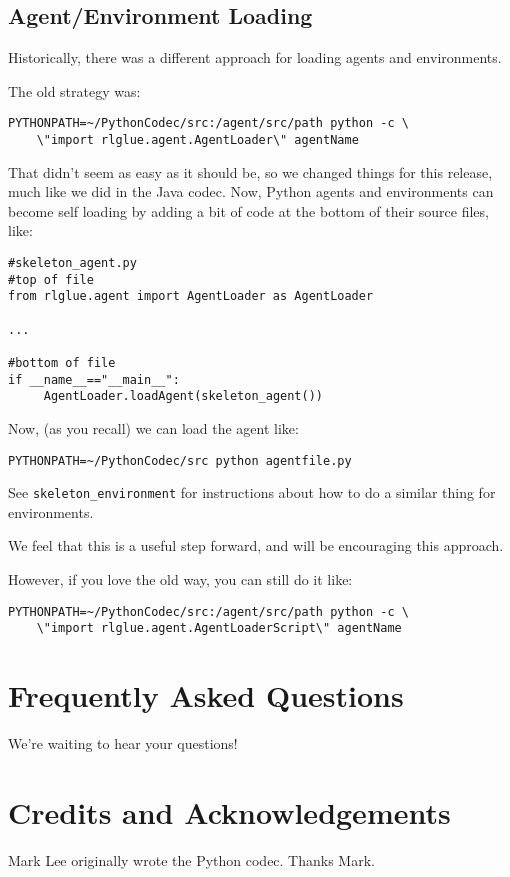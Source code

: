 \documentclass[11pt]{article}
\begin{document}
\subsection{Agent/Environment Loading}
Historically, there was a different approach for loading agents and environments.

The old strategy was:
\begin{verbatim}
PYTHONPATH=~/PythonCodec/src:/agent/src/path python -c \
    \"import rlglue.agent.AgentLoader\" agentName
\end{verbatim}

That didn't seem as easy as it should be, so we changed things for this release, much like we did in the Java codec. Now, Python agents and environments can become 
self loading by adding a bit of code at the bottom of their source files, like:
\begin{verbatim}
#skeleton_agent.py
#top of file
from rlglue.agent import AgentLoader as AgentLoader

...

#bottom of file
if __name__=="__main__":
     AgentLoader.loadAgent(skeleton_agent())
\end{verbatim}

Now, (as you recall) we can load the agent like:
\begin{verbatim}
PYTHONPATH=~/PythonCodec/src python agentfile.py
\end{verbatim}

See \texttt{skeleton\_environment} for instructions about how to do a similar thing for environments.

We feel that this is a useful step forward, and will be encouraging this approach.

However, if you love the old way, you can still do it like:

\begin{verbatim}
PYTHONPATH=~/PythonCodec/src:/agent/src/path python -c \
    \"import rlglue.agent.AgentLoaderScript\" agentName
\end{verbatim}


\section{Frequently Asked Questions}
We're waiting to hear your questions!

\section{Credits and Acknowledgements}
Mark Lee originally wrote the Python codec.  Thanks Mark.
\end{document}
